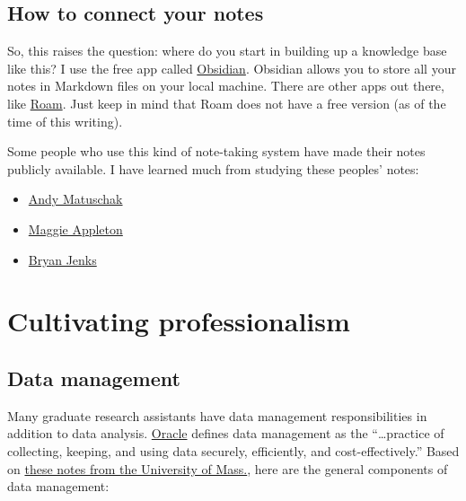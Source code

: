 \documentclass[
]{book}
\begin{document}
\hypertarget{how-to-connect-your-notes}{%
\section{How to connect your notes}\label{how-to-connect-your-notes}}

So, this raises the question: where do you start in building up a knowledge base like this? I use the free app called \href{https://obsidian.md/}{Obsidian}. Obsidian allows you to store all your notes in Markdown files on your local machine. There are other apps out there, like \href{https://roamresearch.com/}{Roam}. Just keep in mind that Roam does not have a free version (as of the time of this writing).

Some people who use this kind of note-taking system have made their notes publicly available. I have learned much from studying these peoples' notes:

\begin{itemize}
\item
  \href{https://notes.andymatuschak.org/About_these_notes}{Andy Matuschak}
\item
  \href{https://maggieappleton.com/notes}{Maggie Appleton}
\item
  \href{https://publish.obsidian.md/bryan-jenks/Z/INDEX}{Bryan Jenks}
\end{itemize}

\hypertarget{cultivating-professionalism}{%
\chapter{Cultivating professionalism}\label{cultivating-professionalism}}

\hypertarget{data-management}{%
\section{Data management}\label{data-management}}

Many graduate research assistants have data management responsibilities in addition to data analysis. \href{https://www.oracle.com/database/what-is-data-management/}{Oracle} defines data management as the ``\ldots practice of collecting, keeping, and using data securely, efficiently, and cost-effectively.'' Based on \href{https://people.umass.edu/biostat690c/pdf/1.\%20\%20Principles\%20of\%20Data\%20Management\%202020.pdf}{these notes from the University of Mass.}, here are the general components of data management:
\end{document}
